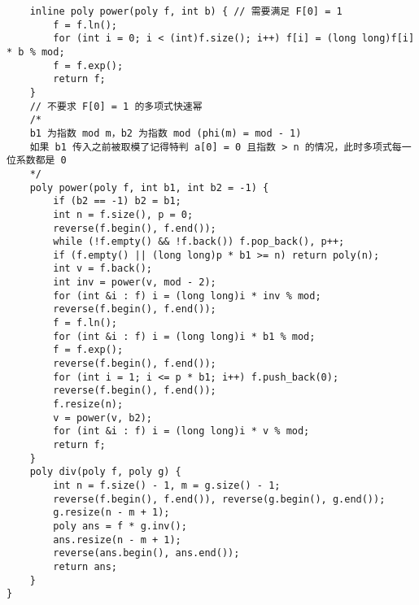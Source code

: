\begin{verbatim}
    inline poly power(poly f, int b) { // 需要满足 F[0] = 1
        f = f.ln();
        for (int i = 0; i < (int)f.size(); i++) f[i] = (long long)f[i] * b % mod;
        f = f.exp();
        return f;
    }
    // 不要求 F[0] = 1 的多项式快速幂
    /*
    b1 为指数 mod m，b2 为指数 mod (phi(m) = mod - 1)
    如果 b1 传入之前被取模了记得特判 a[0] = 0 且指数 > n 的情况，此时多项式每一位系数都是 0
    */
    poly power(poly f, int b1, int b2 = -1) {
        if (b2 == -1) b2 = b1;
        int n = f.size(), p = 0;
        reverse(f.begin(), f.end());
        while (!f.empty() && !f.back()) f.pop_back(), p++;
        if (f.empty() || (long long)p * b1 >= n) return poly(n);
        int v = f.back();
        int inv = power(v, mod - 2);
        for (int &i : f) i = (long long)i * inv % mod;
        reverse(f.begin(), f.end());
        f = f.ln();
        for (int &i : f) i = (long long)i * b1 % mod;
        f = f.exp();
        reverse(f.begin(), f.end());
        for (int i = 1; i <= p * b1; i++) f.push_back(0);
        reverse(f.begin(), f.end());
        f.resize(n);
        v = power(v, b2);
        for (int &i : f) i = (long long)i * v % mod;
        return f;
    }
    poly div(poly f, poly g) {
        int n = f.size() - 1, m = g.size() - 1;
        reverse(f.begin(), f.end()), reverse(g.begin(), g.end());
        g.resize(n - m + 1);
        poly ans = f * g.inv();
        ans.resize(n - m + 1);
        reverse(ans.begin(), ans.end());
        return ans;
    }
}
\end{verbatim}